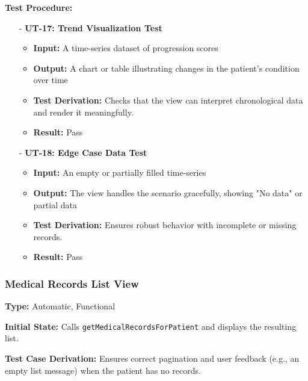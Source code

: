 \documentclass[12pt, titlepage]{article}
\begin{document}
\noindent \textbf{Test Procedure:}
\begin{itemize}
   \item[-] \textbf{UT-17: Trend Visualization Test} \label{test:progress-view-trend}
   \begin{itemize}
     \item \textbf{Input:} A time-series dataset of progression scores
     \item \textbf{Output:} A chart or table illustrating changes in the patient's condition over time
     \item \textbf{Test Derivation:} Checks that the view can interpret chronological data and render it meaningfully.
     \item \textbf{Result:} Pass
   \end{itemize}

   \item[-] \textbf{UT-18: Edge Case Data Test} \label{test:progress-view-edge}
   \begin{itemize}
     \item \textbf{Input:} An empty or partially filled time-series
     \item \textbf{Output:} The view handles the scenario gracefully, showing "No data" or partial data
     \item \textbf{Test Derivation:} Ensures robust behavior with incomplete or missing records.
     \item \textbf{Result:} Pass
   \end{itemize}
\end{itemize}
\vspace{10pt}


\subsubsection{Medical Records List View}
\textbf{Type:} Automatic, Functional
\vspace{10pt}

\noindent \textbf{Initial State:}
Calls \texttt{getMedicalRecordsForPatient} and displays the resulting list.
\vspace{10pt}

\noindent \textbf{Test Case Derivation:}
Ensures correct pagination and user feedback (e.g., an empty list message) when the patient has no records.
\vspace{10pt}
\end{document}
